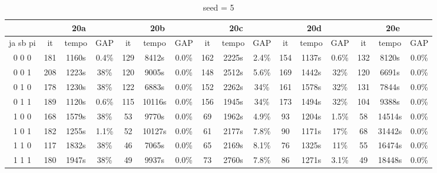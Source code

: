 \documentclass[12pt]{article}
\begin{document}
\begin{table}[!htb]
\centering
\footnotesize
\begin{tabular}{|c||c|c|c||c|c|c||c|c|c||c|c|c||c|c|c|}
\cline{2-16}
\multicolumn{1}{c||}{} & \multicolumn{3}{c||}{20a} & \multicolumn{3}{c||}{20b} & \multicolumn{3}{c||}{20c} & \multicolumn{3}{c||}{20d} & \multicolumn{3}{c|}{20e}\\
\hline
ja sb pi & it & tempo & GAP & it & tempo & GAP & it & tempo & GAP & it & tempo & GAP & it & tempo & GAP \\
\hline
0 0 0 & 181 & 1160s & 0.4\% & 129 & 8412s & 0.0\% & 162 & 2225s & 2.4\% & 154 & 1137s & 0.6\% & 132 & 8120s & 0.0\% \\
0 0 1 & 208 & 1223s & 38\% & 120 & 9005s & 0.0\% & 148 & 2512s & 5.6\% & 169 & 1442s & 32\% & 120 & 6691s & 0.0\% \\
0 1 0 & 178 & 1230s & 38\% & 122 & 6883s & 0.0\% & 152 & 2262s & 34\% & 161 & 1578s & 32\% & 131 & 7844s & 0.0\% \\
0 1 1 & 189 & 1120s & 0.6\% & 115 & 10116s & 0.0\% & 156 & 1945s & 34\% & 173 & 1494s & 32\% & 104 & 9388s & 0.0\% \\
1 0 0 & 168 & 1579s & 38\% & 53 & 9770s & 0.0\% & 69 & 1962s & 4.9\% & 93 & 1204s & 1.5\% & 58 & 14514s & 0.0\% \\
1 0 1 & 182 & 1255s & 1.1\% & 52 & 10127s & 0.0\% & 61 & 2177s & 7.8\% & 90 & 1171s & 17\% & 68 & 31442s & 0.0\% \\
1 1 0 & 117 & 1832s & 38\% & 46 & 7065s & 0.0\% & 65 & 2169s & 8.1\% & 76 & 1325s & 11\% & 55 & 16474s & 0.0\% \\
1 1 1 & 180 & 1947s & 38\% & 49 & 9937s & 0.0\% & 73 & 2760s & 7.8\% & 86 & 1271s & 3.1\% & 49 & 18448s & 0.0\% \\
\hline
\end{tabular}
\caption{seed = 5}
\end{table}
\end{document}
